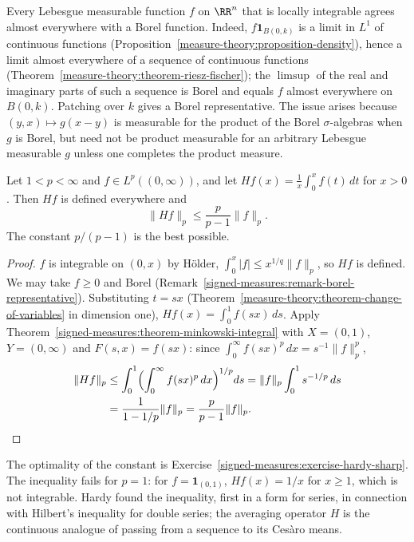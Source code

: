\begin{remark}\label{signed-measures:remark-borel-representative}
Every Lebesgue measurable function $f$ on $\RR^n$ that is locally integrable agrees almost everywhere with a Borel function. Indeed, $f\mathbf{1}_{B(0, k)}$ is a limit in
$L^1$ of continuous functions (Proposition~\ref{measure-theory:proposition-density}), hence a limit almost everywhere of a sequence of continuous functions
(Theorem~\ref{measure-theory:theorem-riesz-fischer}); the $\limsup$ of the real and imaginary parts of such a sequence is Borel and equals $f$ almost everywhere on $B(0, k)$. Patching over $k$ gives a
Borel representative. The issue arises because $(y, x) \mapsto g(x - y)$ is measurable for the product of the Borel $\sigma$-algebras when $g$ is Borel, but need not be product measurable for an arbitrary
Lebesgue measurable $g$ unless one completes the product measure.
\end{remark}

\begin{theorem}\label{signed-measures:theorem-hardy}
Let $1 < p < \infty$ and $f \in L^p((0, \infty))$, and let $Hf(x) = \frac1x\int_0^xf(t)\,dt$ for $x > 0$. Then $Hf$ is defined everywhere and
\[
\|Hf\|_p \leq \frac{p}{p - 1}\|f\|_p .
\]
The constant $p/(p - 1)$ is the best possible.
\end{theorem}

\begin{proof}
$f$ is integrable on $(0, x)$ by H\"older, $\int_0^x|f| \leq x^{1/q}\|f\|_p$, so $Hf$ is defined. We may take $f \geq 0$ and Borel (Remark~\ref{signed-measures:remark-borel-representative}).
Substituting $t = sx$ (Theorem~\ref{measure-theory:theorem-change-of-variables} in dimension one), $Hf(x) = \int_0^1f(sx)\,ds$. Apply
Theorem~\ref{signed-measures:theorem-minkowski-integral} with $X = (0, 1)$, $Y = (0, \infty)$ and $F(s, x) = f(sx)$: since $\int_0^\infty f(sx)^p\,dx = s^{-1}\|f\|_p^p$,
\[\begin{aligned}
\|Hf\|_p &\leq \int_0^1\Bigl(\int_0^\infty f(sx)^p\,dx\Bigr)^{1/p}ds = \|f\|_p\int_0^1s^{-1/p}\,ds \\
&= \frac{1}{1 - 1/p}\|f\|_p = \frac{p}{p - 1}\|f\|_p .
\end{aligned}\]
\end{proof}

The optimality of the constant is Exercise~\ref{signed-measures:exercise-hardy-sharp}. The inequality fails for $p = 1$: for $f = \mathbf{1}_{(0, 1)}$, $Hf(x) = 1/x$ for $x \geq 1$, which is not integrable. Hardy found the inequality, first in a form for series, in connection with
Hilbert's inequality for double series; the averaging operator $H$ is the continuous analogue of passing from a sequence to its Ces\`aro means.

